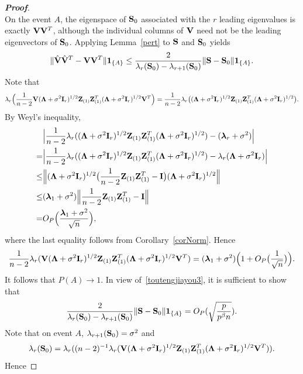 \documentclass[3p]{elsarticle}
\newcommand{\bZ}{\mathbf{Z}}
\newcommand{\bfsym}[1]{\ensuremath{\boldsymbol{#1}}}
\def\blambda {\bfsym {\lambda}}        \def\bLambda {\bfsym {\Lambda}}
\theoremstyle{plain}
\theoremstyle{definition}
\theoremstyle{remark}
\begin{document}
\begin{appendices}
\begin{proof}[\textbf{Proof}]
$$        $$
        On the event $A$, the eigenspace of $\mathbf{S}_0$ associated with the $r$ leading eigenvalues is exactly $\mathbf{V} \mathbf{V}^T$, although the individual columns of $\mathbf{V}$ need not be the leading eigenvectors of $\mathbf{S}_0$.
    Applying Lemma~\ref{pert} to $\mathbf{S}$ and $\mathbf{S}_0$ yields
    \begin{equation}\label{toutengjiayou3}
    \|\hat{\mathbf{V}}\hat{\mathbf{V}}^T - \mathbf{V}\mathbf{V} ^T\| \mathbf{1}_{\{A\}}\leq
        \frac{2}{\lambda_r(\mathbf{S}_0)-\lambda_{r+1}(\mathbf{S}_0)}\|\mathbf{S}-\mathbf{S}_0\|\mathbf{1}_{\{A\}}.
    \end{equation}
    Note that
$$
        \lambda_r\Big(\frac{1}{n-2}\BV(\bLambda+\sigma^2\BI_r)^{1/2}\bZ_{(1)} \bZ_{(1)}^T(\bLambda+\sigma^2\BI_r)^{1/2}\BV^T\Big)
    =
        \frac{1}{n-2}\lambda_r\big((\bLambda+\sigma^2\BI_r)^{1/2}\bZ_{(1)} \bZ_{(1)}^T(\bLambda+\sigma^2\BI_r)^{1/2}\big).
$$
By Weyl's inequality,
$$
    \begin{aligned}
        &\Big|
        \frac{1}{n-2}\lambda_r((\bLambda+\sigma^2 \BI_r)^{1/2}\bZ_{(1)} \bZ_{(1)}^T(\bLambda+\sigma^2 \BI_r)^{1/2})
    -
        (\blambda_r+\sigma^2)
    \Big|\\
        =&\Big|
    \frac{1}{n-2}\lambda_r((\bLambda+\sigma^2 \BI_r)^{1/2}\bZ_{(1)} \bZ_{(1)}^T(\bLambda+\sigma^2 \BI_r)^{1/2})
    -
    \lambda_r(\bLambda+\sigma^2\BI_r)
    \Big|
        \\
        \leq&
        \Big\|(\bLambda+\sigma^2\BI_r)^{1/2}\big(\frac{1}{n-2}\bZ_{(1)} \bZ_{(1)}^T-\BI\big)(\bLambda+\sigma^2\BI_r)^{1/2}\Big\|\\
        \leq& (\blambda_1+\sigma^2)\Big\|\frac{1}{n-2}\bZ_{(1)} \bZ_{(1)}^T-\BI\Big\|
        \\
        =& O_P\Big(\frac{\blambda_1+\sigma^2}{\sqrt{n}}\Big),
    \end{aligned}
$$
    where the last equality follows from Corollary~\ref{corNorm}.
    Hence
$$
        \frac{1}{n-2}\lambda_r(\BV(\bLambda+\sigma^2 \BI_r)^{1/2}\bZ_{(1)} \bZ_{(1)}^T(\bLambda+\sigma^2 \BI_r)^{1/2}\BV^T)
        =(\blambda_1+\sigma^2)\Big(1+O_P\big(\frac{1}{\sqrt{n}}\big)\Big).
        $$
        It follows that $P(A)\to 1$.
        In view of~\eqref{toutengjiayou3}, it is sufficient to show that
        $$
        \frac{2}{\lambda_r(\mathbf{S}_0)-\lambda_{r+1}(\mathbf{S}_0)}\|\mathbf{S}-\mathbf{S}_0\|\mathbf{1}_{\{A\}}=O_P(\sqrt{\frac{p}{p^{\beta}n }}).
        $$
        Note that on event $A$, $\lambda_{r+1}(\mathbf{S}_0)=\sigma^2$ and
        $$\lambda_r(\BS_0)=\lambda_r((n-2)^{-1}\lambda_r(\BV(\bLambda+\sigma^2 \BI_r)^{1/2}\bZ_{(1)} \bZ_{(1)}^T(\bLambda+\sigma^2 \BI_r)^{1/2}\BV^T)).$$
        Hence

\end{proof}
\end{appendices}
\end{document}
